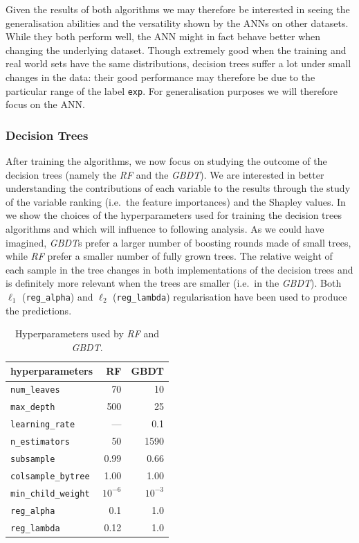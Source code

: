 Given the results of both algorithms we may therefore be interested in seeing the generalisation abilities and the versatility shown by the ANNs on other datasets.
While they both perform well, the ANN might in fact behave better when changing the underlying dataset.
Though extremely good when the training and real world sets have the same distributions, decision trees suffer a lot under small changes in the data: their good performance may therefore be due to the particular range of the label \texttt{exp}.
For generalisation purposes we will therefore focus on the ANN.


\subsubsection{Decision Trees}

After training the algorithms, we now focus on studying the outcome of the decision trees (namely the \emph{RF} and the \emph{GBDT}).
We are interested in better understanding the contributions of each variable to the results through the study of the variable ranking (i.e.\ the feature importances) and the Shapley values.
In  we show the choices of the hyperparameters used for training the decision trees algorithms and which will influence to following analysis.
As we could have imagined, \emph{GBDT}s prefer a larger number of boosting rounds made of small trees, while \emph{RF} prefer a smaller number of fully grown trees.
The relative weight of each sample in the tree changes in both implementations of the decision trees and is definitely more relevant when the trees are smaller (i.e.\ in the \emph{GBDT}).
Both $\ell_1$ (\texttt{reg\_alpha}) and $\ell_2$ (\texttt{reg\_lambda}) regularisation have been used to produce the predictions.

\begin{table}[htbp]
  \centering
  \begin{tabular}{@{}lrr@{}}
      \toprule
      \textbf{hyperparameters}    & \textbf{RF} & \textbf{GBDT} \\
      \midrule
      \texttt{num\_leaves}        & 70          & 10            \\
      \texttt{max\_depth} 	  & 500         & 25            \\
      \texttt{learning\_rate}     & ---         & 0.1           \\
      \texttt{n\_estimators} 	  & 50          & 1590          \\
      \texttt{subsample} 	  & 0.99        & 0.66          \\
      \texttt{colsample\_bytree}  & 1.00        & 1.00          \\ \texttt{min\_child\_weight} & $10^{-6}$   & $10^{-3}$     \\
      \texttt{reg\_alpha} 	  & 0.1         & 1.0           \\
      \texttt{reg\_lambda}        & 0.12        & 1.0           \\
      \bottomrule
  \end{tabular}
  \caption{Hyperparameters used by \emph{RF} and \emph{GBDT}.}
  \label{tab:lumps:hyp}
\end{table}

